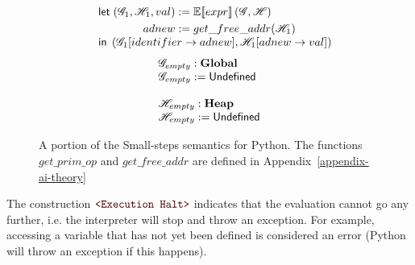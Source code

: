 \begin{figure}
\begin{minipage}{.46\textwidth}
\[\begin{array}{l}
    \quad \mathsf{let}\;
    \begin{aligned}[t]
      \left(\mathscr{G}_1, \mathscr{H}_1, val\right) &:= \mathbb{E}\!\left\llbracket expr \right\rrbracket\left(\mathscr{G}, \mathscr{H}\right) \\
      adnew &:= get\_free\_addr(\mathscr{H}_1) \\
    \end{aligned}\\
    \quad \mathsf{in}\; \left(\mathscr{G}_1[identifier \to adnew], \mathscr{H}_1[adnew \to val]\right) \\
  \end{array}
\]
\[
  \begin{array}{l}
    \mathscr{G}_{empty} : \mathbf{Global} \\
    \mathscr{G}_{empty} := \mathsf{Undefined} \\
    \\
    \mathscr{H}_{empty} : \mathbf{Heap} \\
    \mathscr{H}_{empty} := \mathsf{Undefined} \\
  \end{array}
\]
\end{minipage}
\caption{A portion of the Small-steps semantics for Python. The functions $get\_prim\_op$
  and $get\_free\_addr$ are defined in Appendix~\ref{appendix-ai-theory}\label{smallstep1}}
\end{figure}

%
%

The construction $\Halt$ indicates that the evaluation cannot go any further, i.e. the
interpreter will stop and throw an exception. For example, accessing a variable that
has not yet been defined is considered an error (Python will throw an exception if this
happens).

